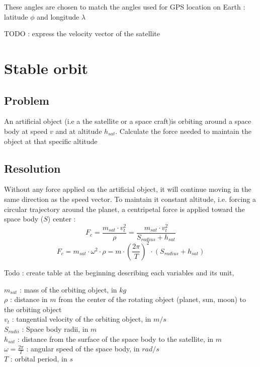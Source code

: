 \documentclass[12pt,a4paper]{article}
\begin{document}
 These angles are chosen to match the angles used for GPS location on Earth : latitude $\phi$ and longitude $\lambda$

TODO : express the velocity vector of the satellite 

\section{Stable orbit}
\subsection{Problem}
An artificial object (i.e a the satellite or a space craft)is orbiting around a space body at speed $v$ and at altitude $h_{sat}$. 
Calculate the force needed to maintain the object at that specific altitude

\subsection{Resolution}
Without any force applied on the artificial object, it will continue moving in the same direction as the speed vector. To maintain it constant altitude, i.e. forcing a circular trajectory around the planet, a centripetal force is applied toward the space body ($S$) center : 
\begin{equation}
	F_c = \frac{m_{sat} \cdot v_t^2}{\rho} = \frac{m_{sat} \cdot v_t^2}{S_{radius} + h_{sat}}
\end{equation}
\begin{equation}
	F_c = m_{sat} \cdot \omega^2 \cdot \rho= m \cdot (\frac{2 \pi}{T})^2 \cdot (S_{radius} + h_{sat})
\end{equation}

Todo : create table at the beginning describing each variables and its unit, 

$m_{sat}$ : mass of the orbiting object, in $kg$\\
$\rho$ : distance in $m$ from the center of the rotating object (planet, sun, moon) to the orbiting object\\
$v_t$ : tangential velocity of the orbiting object, in $m/s$\\
$S_{radii}$ : Space body radii, in $m$\\
$h_{sat}$ : distance from the surface of the space body to the satellite, in $m$\\
$\omega = \frac{2 \pi}{T}$ : angular speed of the space body, in $rad/s$\\
$T$ : orbital period, in $s$\\
\end{document}
